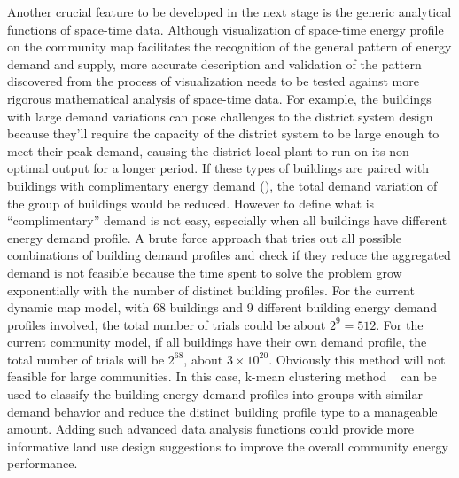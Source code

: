 \begin{itemize}
  Another crucial feature to be developed in the next stage is the
  generic analytical functions of space-time data. Although
  visualization of space-time energy profile on the community map
  facilitates the recognition of the general pattern of energy demand
  and supply, more accurate description and validation of the pattern
  discovered from the process of visualization needs to be tested
  against more rigorous mathematical analysis of space-time data. For
  example, the buildings with large demand variations can pose
  challenges to the district system design because they'll require the
  capacity of the district system to be large enough to meet their
  peak demand, causing the district local plant to run on its
  non-optimal output for a longer period. If these types of buildings
  are paired with buildings with complimentary energy demand
  (), the total demand variation of the group of
  buildings would be reduced. However to define what is
  ``complimentary'' demand is not easy, especially when all buildings
  have different energy demand profile. A brute force approach that
  tries out all possible combinations of building demand profiles and
  check if they reduce the aggregated demand is not feasible because
  the time spent to solve the problem grow exponentially with the
  number of distinct building profiles. For the current dynamic map
  model, with 68 buildings and 9 different building energy demand
  profiles involved, the total number of trials could be about
  $2^9 = 512$. For the current community model, if all buildings have
  their own demand profile, the total number of trials will be
  $2^{68}$, about $3\times10^{20}$. Obviously this method will not
  feasible for large communities. In this case, k-mean clustering
  method ~\cite{kmean2015} can be used to classify the building energy
  demand profiles into groups with similar demand behavior and reduce
  the distinct building profile type to a manageable amount. Adding
  such advanced data analysis functions could provide more informative
  land use design suggestions to improve the overall community energy
  performance.

\end{itemize}